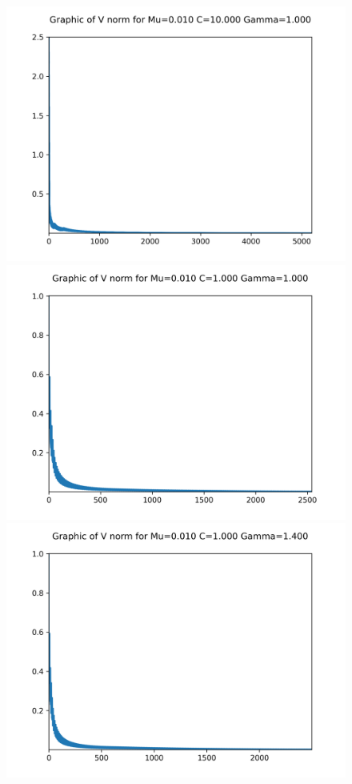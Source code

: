 \begin{figure}[H]
	\centering
	\includegraphics[scale=0.65]{../graphs_data_nonsmooth_2/norms/Graph_V_norms_mu0.010_C10.000_gamma1.000.png}
	\includegraphics[scale=0.65]{../graphs_data_nonsmooth_2/norms/Graph_V_norms_mu0.010_C1.000_gamma1.000.png}	
	\includegraphics[scale=0.65]{../graphs_data_nonsmooth_2/norms/Graph_V_norms_mu0.010_C1.000_gamma1.400.png}
\end{figure}

